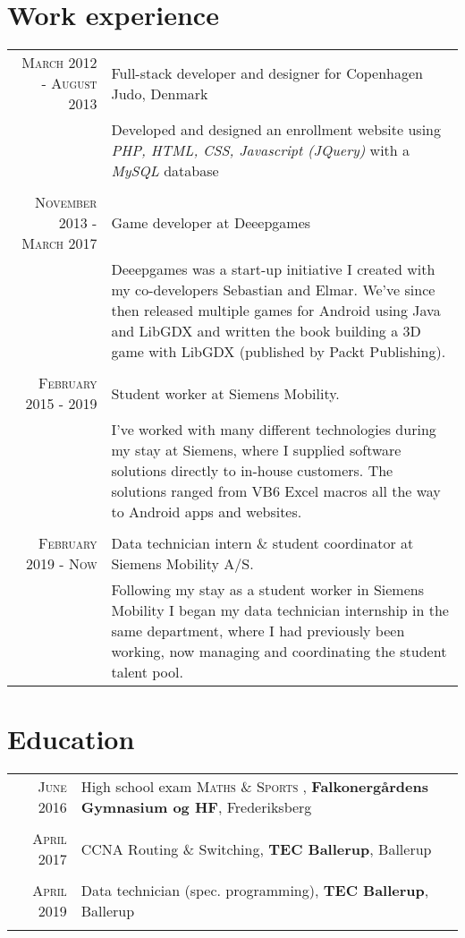 \documentclass[a4paper,10pt]{article}
\begin{document}
\section{Work experience}
\begin{tabular}{r|p{11cm}}
    \textsc{March 2012 - August 2013} & Full-stack developer and designer for Copenhagen Judo, Denmark \\&\footnotesize{Developed and designed an enrollment website using \textit{PHP, HTML, CSS, Javascript (JQuery)} with a \textit{MySQL} database}\\
    
    \multicolumn{2}{c}{} \\
    \textsc{November 2013 - March 2017} & Game developer at Deeepgames\\&\footnotesize{Deeepgames was a start-up initiative I created with my co-developers Sebastian and Elmar. We've since then released multiple games for Android using Java and LibGDX and written the book building a 3D game with LibGDX (published by Packt Publishing).}\\
    
    \multicolumn{2}{c}{} \\
    \textsc{February 2015 - 2019} & Student worker at Siemens Mobility. \\ &\footnotesize{I've worked with many different technologies during my stay at Siemens, where I supplied software solutions directly to in-house customers. The solutions ranged from VB6 Excel macros all the way to Android apps and websites.}\\
    
    \multicolumn{2}{c}{} \\
    \textsc{February 2019 - Now} & Data technician intern \& student coordinator at Siemens Mobility A/S. \\ &\footnotesize{Following my stay as a student worker in Siemens Mobility I began my data technician internship in the same department, where I had previously been working, now managing and coordinating the student talent pool.}\\
\end{tabular}

\section{Education}
\begin{tabular}{rl}	
\textsc{June 2016} & High school exam \textsc{Maths \& Sports} , \normalsize\textbf{Falkonergårdens Gymnasium og HF}, Frederiksberg\\
& \\
 \textsc{April} 2017 & CCNA Routing \& Switching, \textbf{TEC Ballerup}, Ballerup\\ & \\
 \textsc{April} 2019 & Data technician (spec. programming), \textbf{TEC Ballerup}, Ballerup\\ & \\
\end{tabular}
\end{document}
